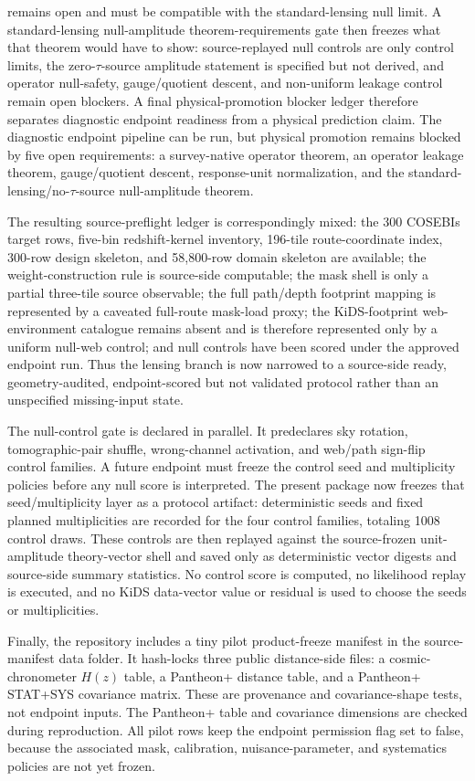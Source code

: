 \documentclass[11pt]{article}
\begin{document}
remains open and must be compatible with the standard-lensing null limit.
A standard-lensing null-amplitude theorem-requirements gate then freezes what
that theorem would have to show: source-replayed null controls are only control
limits, the zero-\(\tau\)-source amplitude statement is specified but not
derived, and operator null-safety, gauge/quotient descent, and non-uniform
leakage control remain open blockers.
A final physical-promotion blocker ledger therefore separates diagnostic
endpoint readiness from a physical prediction claim. The diagnostic endpoint
pipeline can be run, but physical promotion remains blocked by five open
requirements: a survey-native operator theorem, an operator leakage theorem,
gauge/quotient descent, response-unit normalization, and the
standard-lensing/no-\(\tau\)-source null-amplitude theorem.

The resulting source-preflight ledger is correspondingly mixed: the 300 COSEBIs
target rows, five-bin redshift-kernel inventory, 196-tile route-coordinate
index, 300-row design skeleton, and 58{,}800-row domain skeleton are available;
the weight-construction rule is source-side computable; the mask shell is only a
partial three-tile source observable; the full path/depth footprint mapping is
represented by a caveated full-route mask-load proxy; the KiDS-footprint
web-environment catalogue remains absent and is therefore represented only by a
uniform null-web control; and null controls have been scored under the approved
endpoint run. Thus the lensing branch is now narrowed to a source-side ready,
geometry-audited, endpoint-scored but not validated protocol rather than an
unspecified missing-input state.

The null-control gate is declared in parallel. It predeclares sky rotation,
tomographic-pair shuffle, wrong-channel activation, and web/path sign-flip
control families. A future endpoint must freeze the control seed and
multiplicity policies before any null score is interpreted.
The present package now freezes that seed/multiplicity layer as a protocol
artifact: deterministic seeds and fixed planned multiplicities are recorded for
the four control families, totaling 1008 control draws. These controls are then
replayed against the source-frozen unit-amplitude theory-vector shell and saved
only as deterministic vector digests and source-side summary statistics. No
control score is computed, no likelihood replay is executed, and no KiDS data-vector value or
residual is used to choose the seeds or multiplicities.

Finally, the repository includes a tiny pilot product-freeze manifest in the
source-manifest data folder. It hash-locks three public distance-side files: a
cosmic-chronometer \(H(z)\) table, a Pantheon+ distance table, and a Pantheon+
STAT+SYS covariance matrix. These are provenance and covariance-shape tests,
not endpoint inputs. The Pantheon+ table and covariance dimensions are checked
during reproduction. All pilot rows keep the endpoint permission flag set to
false, because the associated mask, calibration, nuisance-parameter, and
systematics policies are not yet frozen.
\end{document}
